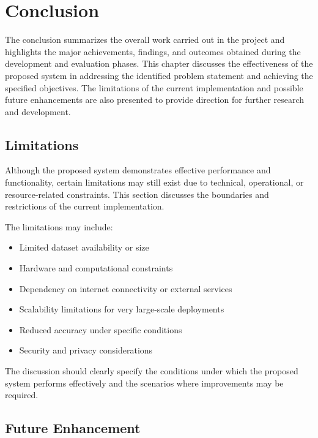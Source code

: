 \chapter{Conclusion}

The conclusion summarizes the overall work carried out in the project and highlights the major achievements, findings, and outcomes obtained during the development and evaluation phases. This chapter discusses the effectiveness of the proposed system in addressing the identified problem statement and achieving the specified objectives. The limitations of the current implementation and possible future enhancements are also presented to provide direction for further research and development.


\section{Limitations}

Although the proposed system demonstrates effective performance and functionality, certain limitations may still exist due to technical, operational, or resource-related constraints. This section discusses the boundaries and restrictions of the current implementation.

The limitations may include:
\begin{itemize}
    \item Limited dataset availability or size
    \item Hardware and computational constraints
    \item Dependency on internet connectivity or external services
    \item Scalability limitations for very large-scale deployments
    \item Reduced accuracy under specific conditions
    \item Security and privacy considerations
\end{itemize}

The discussion should clearly specify the conditions under which the proposed system performs effectively and the scenarios where improvements may be required.


\section{Future Enhancement}

